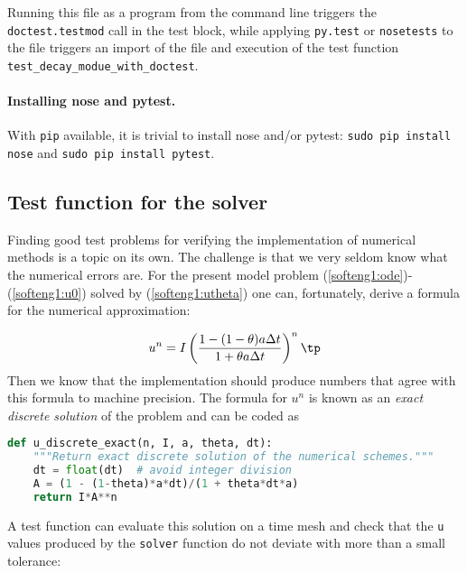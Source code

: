 \documentclass[graybox,sectrefs,envcountresetchap,open=right,final]{svmonodo}
\begin{document}
Running this file as a program from the command line
triggers the \texttt{doctest.testmod} call
in the test block, while applying \texttt{py.test} or \texttt{nosetests} to the file triggers
an import of the file and execution of the test function
\Verb!test_decay_modue_with_doctest!.

\paragraph{Installing nose and pytest.}
With \texttt{pip} available, it is trivial to install nose and/or pytest:
\texttt{sudo pip install nose} and \texttt{sudo pip install pytest}.

\subsection{Test function for the solver}

Finding good test problems for verifying the implementation of numerical
methods is a topic on its own. The challenge is that we very seldom know
what the numerical errors are. For the present model problem
(\ref{softeng1:ode})-(\ref{softeng1:u0}) solved by
(\ref{softeng1:utheta}) one can, fortunately, derive a formula for
the numerical approximation:

\[ u^n = I\left(
\frac{1 - (1-\theta) a\Delta t}{1 + \theta a \Delta t}
\right)^n\tp\]
Then we know that the implementation should
produce numbers that agree with this formula to machine precision.
The formula for $u^n$ is known as an \emph{exact discrete solution} of the
problem and can be coded as







\begin{lstlisting}[language=python,style=blue1_bluegreen]
def u_discrete_exact(n, I, a, theta, dt):
    """Return exact discrete solution of the numerical schemes."""
    dt = float(dt)  # avoid integer division
    A = (1 - (1-theta)*a*dt)/(1 + theta*dt*a)
    return I*A**n

\end{lstlisting}

A test function can evaluate this solution on a time mesh
and check that the \texttt{u} values produced by the \texttt{solver} function
do not deviate with more than a small tolerance:
\end{document}
